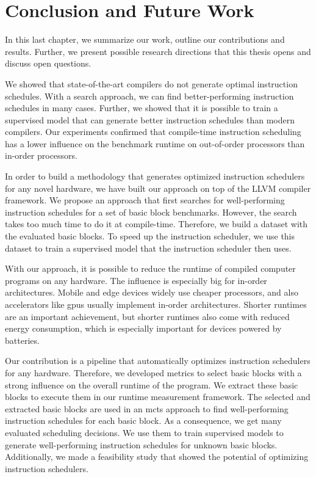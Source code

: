 \chapter{Conclusion and Future Work}
\label{sec:conclusion}
In this last chapter, we summarize our work, outline our contributions and results.
Further, we present possible research directions that this thesis opens and discuss open questions.

We showed that state-of-the-art compilers do not generate optimal instruction schedules.
With a search approach, we can find better-performing instruction schedules in many cases.
Further, we showed that it is possible to train a supervised model that can generate better instruction schedules than modern compilers.
Our experiments confirmed that compile-time instruction scheduling has a lower influence on the benchmark runtime on out-of-order processors than in-order processors.

In order to build a methodology that generates optimized instruction schedulers for any novel hardware, we have built our approach on top of the LLVM compiler framework.
We propose an approach that first searches for well-performing instruction schedules for a set of basic block benchmarks.
However, the search takes too much time to do it at compile-time.
Therefore, we build a dataset with the evaluated basic blocks.
To speed up the instruction scheduler, we use this dataset to train a supervised model that the instruction scheduler then uses.

With our approach, it is possible to reduce the runtime of compiled computer programs on any hardware.
The influence is especially big for in-order architectures.
Mobile and edge devices widely use cheaper processors, and also accelerators like \acp{gpu} usually implement in-order architectures.
Shorter runtimes are an important achievement, but shorter runtimes also come with reduced energy consumption, which is especially important for devices powered by batteries.

Our contribution is a pipeline that automatically optimizes instruction schedulers for any hardware.
Therefore, we developed metrics to select basic blocks with a strong influence on the overall runtime of the program.
We extract these basic blocks to execute them in our runtime measurement framework.
The selected and extracted basic blocks are used in an \ac{mcts} approach to find well-performing instruction schedules for each basic block.
As a consequence, we get many evaluated scheduling decisions.
We use them to train supervised models to generate well-performing instruction schedules for unknown basic blocks.
Additionally, we made a feasibility study that showed the potential of optimizing instruction schedulers.


